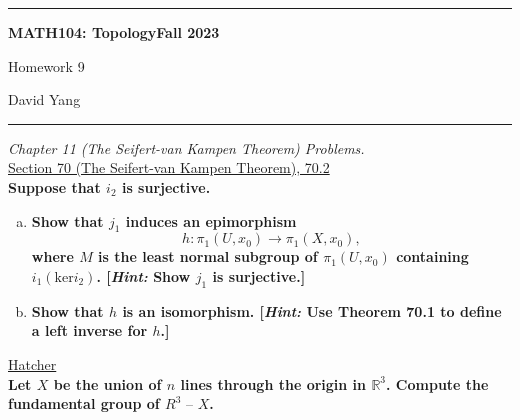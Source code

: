 \documentclass[11pt]{article}
\newcommand{\R}{\mathbb{R}}
\begin{document}
	\hrule
	\begin{center}
        \textbf{MATH104: Topology}\hfill \textbf{Fall 2023}\newline

		{\Large Homework 9}

		David Yang
	\end{center}

\hrule

\vspace{1em}

\textit{Chapter 11 (The Seifert-van Kampen Theorem) Problems.} \\

\underline{Section 70 (The Seifert-van Kampen Theorem), 70.2} \\

\textbf{Suppose that $i_2$ is surjective.}
\begin{enumerate}[a)]
    \item \textbf{Show that $j_1$ induces an epimorphism}
    \[
        h\colon \pi_1(U, x_0) \rightarrow \pi_1(X, x_0),
    \]
    \textbf{where $M$ is the least normal subgroup of $\pi_1(U, x_0)$ containing $i_1(\mathrm{ker} i_2)$. [\textit{Hint:} Show $j_1$ is surjective.]}

    \item \textbf{Show that $h$ is an isomorphism. [\textit{Hint:} Use Theorem 70.1 to define a left inverse for $h$.]}
\end{enumerate}

\underline{Hatcher} \\

\textbf{Let $X$ be the union of $n$ lines through the origin in $\R^3$. Compute the fundamental group of $R^3 \text{ -- } X$.}
\end{document}

